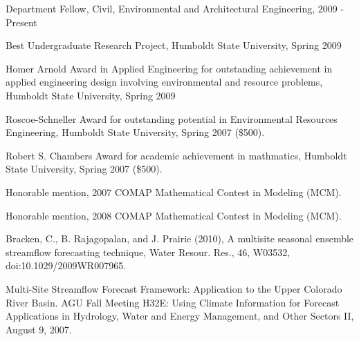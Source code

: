 \documentclass[10pt,a4paper]{scrartcl}
\begin{document}
\begin{cv}{}
        \begin{cvlist}{}\label{awards}
            \item   Department Fellow, Civil, Environmental and Architectural Engineering, 2009 - Present
            \item   Best Undergraduate Research Project, Humboldt State University, Spring 2009
            \item   Homer Arnold Award in Applied Engineering for outstanding achievement in applied engineering design involving environmental and resource problems, Humboldt State University, Spring 2009 
            \item   Roscoe-Schneller Award for outstanding potential in Environmental Resources Engineering, Humboldt State University, Spring 2007 (\$500).

	        \item Robert S. Chambers Award for academic achievement in mathmatics, Humboldt State University, Spring 2007 (\$500).

	        \item Honorable mention, 2007 COMAP Mathematical Contest in Modeling (MCM).
	
	        \item Honorable mention, 2008 COMAP Mathematical Contest in Modeling (MCM).
        \end{cvlist}
        
        \begin{cvlist}{}\label{pub}
            \item   Bracken, C., B. Rajagopalan, and J. Prairie (2010), A multisite seasonal ensemble streamflow forecasting technique, Water Resour. Res., 46, W03532, doi:10.1029/2009WR007965.
        \end{cvlist}
        \begin{cvlist}{}\label{pres}
            \item   Multi-Site Streamflow Forecast Framework: Application to the Upper Colorado River Basin. AGU Fall Meeting H32E: Using Climate Information for Forecast Applications in Hydrology, Water and Energy Management, and Other Sectors II, August 9, 2007.
        \end{cvlist}
    \end{cv}
\end{document}

